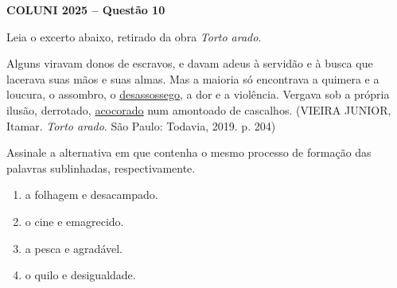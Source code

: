 \textbf{COLUNI 2025 -- Questão 10}\par\medskip Leia o excerto abaixo, retirado da obra \textit{Torto arado}.

\par

Alguns viravam donos de escravos, e davam adeus à servidão e à busca que lacerava suas mãos e suas almas. Mas a maioria só encontrava a quimera e a loucura, o assombro, o \underline{desassossego}, a dor e a violência. Vergava sob a própria ilusão, derrotado, \underline{acocorado} num amontoado de cascalhos. (VIEIRA JUNIOR, Itamar. \textit{Torto arado}. São Paulo: Todavia, 2019. p. 204)

\par

Assinale a alternativa em que contenha o mesmo processo de formação das palavras sublinhadas, respectivamente.\begin{enumerate}
\item a folhagem e desacampado.
\item o cine e emagrecido.
\item a pesca e agradável.
\item o quilo e desigualdade.
\end{enumerate}
